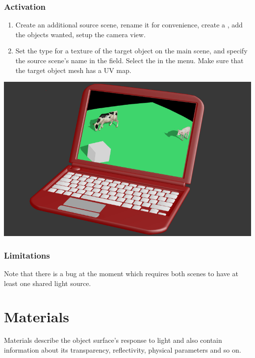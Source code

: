 \documentclass[a4paper,12pt,oneside]{sphinxmanual}
\begin{document}
\subsection{Activation}
\label{textures:id24}\begin{enumerate}
\item {} 
Create an additional source scene, rename it for convenience, create a , add the objects wanted, setup the camera view.

\item {} 
Set the  type for a texture of the target object on the main scene, and specify the source scene's name in the  field. Select the  in the  menu. Make sure that the target object mesh has a UV map.

\end{enumerate}

{\hfill\includegraphics[width=1.000\linewidth]{render_to_texture.jpg}\hfill}


\subsection{Limitations}
\label{textures:id25}
Note that there is a bug at the moment which requires both scenes to have at least one shared light source.
\label{materials:materials}

\chapter{Materials}
\label{materials:index-0}\label{materials::doc}\label{materials:id1}
Materials describe the object surface's response to light and also contain information about its transparency, reflectivity, physical parameters and so on.
\end{document}
